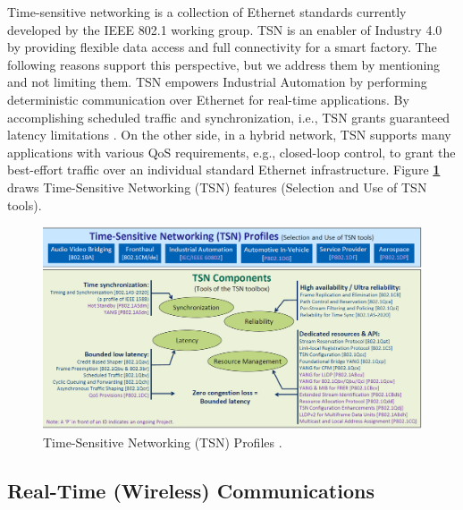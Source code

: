 Time-sensitive networking is a collection of Ethernet standards
currently developed by the IEEE 802.1 working group\cite{TSN2019_study}. TSN is an enabler of Industry 4.0 by providing flexible data access and full connectivity for a smart factory. The following reasons support this perspective, but we address them by mentioning and not limiting them. TSN empowers Industrial Automation by performing deterministic communication over Ethernet for real-time applications. By accomplishing scheduled traffic and synchronization, i.e., TSN grants guaranteed latency limitations \cite{Ginthor2019}.
On the other side, in a hybrid network, TSN supports many applications with various QoS requirements, e.g., closed-loop control, to grant the best-effort traffic over an individual standard Ethernet infrastructure\cite{Ericsson2019}. Figure \textbf{\ref{fig:Time-Sensitive_Networking(TSN)Profiles}} draws Time-Sensitive Networking (TSN) features (Selection and Use of TSN tools).



\begin{figure}

\centering
\includegraphics[scale=0.30]{images/Time-Sensitive_Networking(TSN)Profiles.png}
\caption{Time-Sensitive Networking (TSN) Profiles \cite{TSN2019_study}.}
\label{fig:Time-Sensitive_Networking(TSN)Profiles}
\end{figure}



\subsection{Real-Time (Wireless) Communications}\label{Real-Time (Wireless) Communications}
 
  
